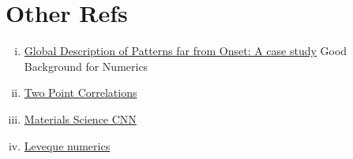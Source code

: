 \documentclass[12pt]{article}
\begin{document}
\section{Other Refs}
\begin{enumerate}[(i)]
    \item \href{https://reader.elsevier.com/reader/sd/pii/S0167278903002173?token=C9ADADC9A05E67C488D5776BD27261885B9517594F4F32DDBFA24510FCC66DC40F1CD86ECEA29C40869C37D271798AEE&originRegion=us-east-1&originCreation=20220903050236}{Global Description of Patterns far from Onset: A case study} Good Background for Numerics
    \item \href{https://reader.elsevier.com/reader/sd/pii/S0021999117304588?token=81C486242EBF6C25D85661B9D2EB516D8E9E85C03AEE1E4FFD7053D45642E780191226B036A6271B42C934E16D7D4C97&originRegion=us-east-1&originCreation=20220923055540}{Two Point Correlations}
    \item \href{https://reader.elsevier.com/reader/sd/pii/S1359645417310443?token=5BB9017DC48FDC8D2BE1AB0639F728DFBF8D9845862F5916F1DE464FC865E00597F1760B5E3D83851F537C7589BCC619&originRegion=us-east-1&originCreation=20220923055710}{Materials Science CNN}
    \item \href{https://epubs-siam-org.ezproxy2.library.arizona.edu/doi/book/10.1137/1.9780898717839}{Leveque numerics}

\end{enumerate}
\end{document}
